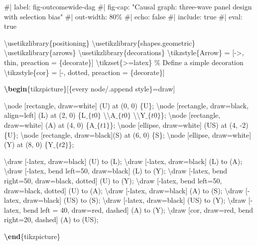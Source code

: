 \documentclass[
  singlecolumn,
  9pt]{article}
\newenvironment{Shaded}{\begin{snugshade}}{\end{snugshade}}
\newcommand{\CommentTok}[1]{\textcolor[rgb]{0.37,0.37,0.37}{#1}}
\newcommand{\ExtensionTok}[1]{\textcolor[rgb]{0.00,0.23,0.31}{#1}}
\newcommand{\FunctionTok}[1]{\textcolor[rgb]{0.28,0.35,0.67}{#1}}
\newcommand{\KeywordTok}[1]{\textcolor[rgb]{0.00,0.23,0.31}{\textbf{#1}}}
\newcommand{\NormalTok}[1]{\textcolor[rgb]{0.00,0.23,0.31}{#1}}
\newcommand{\SpecialStringTok}[1]{\textcolor[rgb]{0.13,0.47,0.30}{#1}}
\begin{document}
\begin{Shaded}
\begin{Highlighting}[]
\NormalTok{\#| label: fig{-}outcomewide{-}dag}
\NormalTok{\#| fig{-}cap: "Causal graph: three{-}wave panel design with selection bias"}
\NormalTok{\#| out{-}width: 80}\CommentTok{\%}
\NormalTok{\#| echo: false}
\NormalTok{\#| include: true}
\NormalTok{\#| eval: true}

\FunctionTok{\textbackslash{}usetikzlibrary}\NormalTok{\{positioning\}}
\FunctionTok{\textbackslash{}usetikzlibrary}\NormalTok{\{shapes.geometric\}}
\FunctionTok{\textbackslash{}usetikzlibrary}\NormalTok{\{arrows\}}
\FunctionTok{\textbackslash{}usetikzlibrary}\NormalTok{\{decorations\}}
\FunctionTok{\textbackslash{}tikzstyle}\NormalTok{\{Arrow\} = [{-}\textgreater{}, thin, preaction = \{decorate\}]}
\FunctionTok{\textbackslash{}tikzset}\NormalTok{\{\textgreater{}=latex\}}
\CommentTok{\% Define a simple decoration}
\FunctionTok{\textbackslash{}tikzstyle}\NormalTok{\{cor\} = [{-}, dotted, preaction = \{decorate\}]}

\KeywordTok{\textbackslash{}begin}\NormalTok{\{}\ExtensionTok{tikzpicture}\NormalTok{\}[\{every node/.append style\}=draw]}

\FunctionTok{\textbackslash{}node}\NormalTok{ [rectangle, draw=white] (U) at (0, 0) \{U\};}
\FunctionTok{\textbackslash{}node}\NormalTok{ [rectangle, draw=black, align=left] (L) at (2, 0) \{L}\SpecialStringTok{$\_\{t0\}$} \FunctionTok{\textbackslash{}\textbackslash{}}\NormalTok{A}\SpecialStringTok{$\_\{t0\}$} \FunctionTok{\textbackslash{}\textbackslash{}}\NormalTok{Y}\SpecialStringTok{$\_\{t0\}$}\NormalTok{\};}
\FunctionTok{\textbackslash{}node}\NormalTok{ [rectangle, draw=white] (A) at (4, 0) \{A}\SpecialStringTok{$\_\{t1\}$}\NormalTok{\};}
\FunctionTok{\textbackslash{}node}\NormalTok{ [ellipse, draw=white] (US) at (4, {-}2) \{U\};}
\FunctionTok{\textbackslash{}node}\NormalTok{ [rectangle, draw=black](S) at (6, 0) \{S\};}
\FunctionTok{\textbackslash{}node}\NormalTok{ [ellipse, draw=white] (Y) at (8, 0) \{Y}\SpecialStringTok{$\_\{t2\}$}\NormalTok{\};}

\FunctionTok{\textbackslash{}draw}\NormalTok{ [{-}latex, draw=black] (U) to (L);}
\FunctionTok{\textbackslash{}draw}\NormalTok{ [{-}latex, draw=black] (L) to (A);}
\FunctionTok{\textbackslash{}draw}\NormalTok{ [{-}latex, bend left=50, draw=black] (L) to (Y);}
\FunctionTok{\textbackslash{}draw}\NormalTok{ [{-}latex, bend right=50, draw=black, dotted] (U) to (Y);}
\FunctionTok{\textbackslash{}draw}\NormalTok{ [{-}latex, bend left=50, draw=black, dotted] (U) to (A);}
\FunctionTok{\textbackslash{}draw}\NormalTok{ [{-}latex, draw=black] (A) to (S);}
\FunctionTok{\textbackslash{}draw}\NormalTok{ [{-}latex, draw=black] (US) to (S);}
\FunctionTok{\textbackslash{}draw}\NormalTok{ [{-}latex, draw=black] (US) to (Y);}
\FunctionTok{\textbackslash{}draw}\NormalTok{ [{-}latex, bend left = 40, draw=red, dashed] (A) to (Y);}
\FunctionTok{\textbackslash{}draw}\NormalTok{ [cor, draw=red, bend right=20, dashed] (A) to (US);}

\KeywordTok{\textbackslash{}end}\NormalTok{\{}\ExtensionTok{tikzpicture}\NormalTok{\}}

\end{Highlighting}
\end{Shaded}
\end{document}
